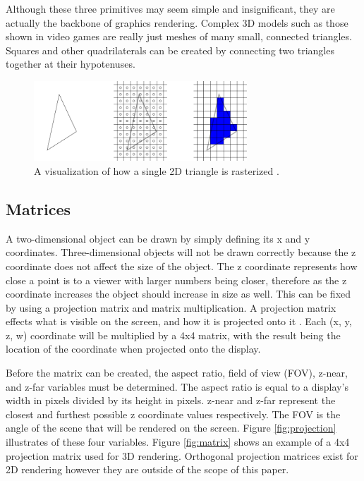 \documentclass{article}
\begin{document}
Although these three primitives may seem simple and insignificant, they are actually the backbone of graphics rendering. Complex 3D models such as those shown in video games are really just meshes of many small, connected triangles. Squares and other quadrilaterals can be created by connecting two triangles together at their hypotenuses.

\begin{figure}[h]
	\centering
	\includegraphics[height=3cm]{triangle-rendering}
	\caption{A visualization of how a single 2D triangle is rasterized \cite{mckesson2018}.}
	\label{fig:triangle-rendering}
\end{figure}

\subsection{Matrices}
A two-dimensional object can be drawn by simply defining its x and y coordinates. Three-dimensional objects will not be drawn correctly because the z coordinate does not affect the size of the object. The z coordinate represents how close a point is to a viewer with larger numbers being closer, therefore as the z coordinate increases the object should increase in size as well. This can be fixed by using a projection matrix and matrix multiplication. A projection matrix effects what is visible on the screen, and how it is projected onto it \cite{sellers2016}. Each (x, y, z, w) coordinate will be multiplied by a 4x4 matrix, with the result being the location of the coordinate when projected onto the display.

Before the matrix can be created, the aspect ratio, field of view (FOV), z-near, and z-far variables must be determined. The aspect ratio is equal to a display's width in pixels divided by its height in pixels. z-near and z-far represent the closest and furthest possible z coordinate values respectively. The FOV is the angle of the scene that will be rendered on the screen. Figure \ref{fig:projection} illustrates of these four variables. Figure \ref{fig:matrix} shows an example of a 4x4 projection matrix used for 3D rendering. Orthogonal projection matrices exist for 2D rendering however they are outside of the scope of this paper.
\end{document}
